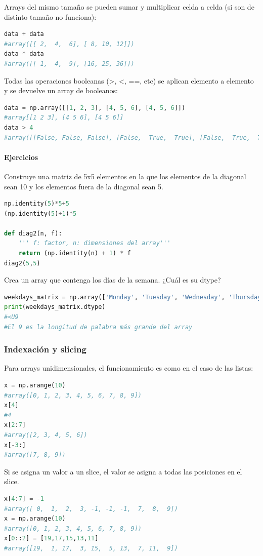 Arrays del mismo tamaño se pueden sumar y multiplicar celda a celda (si son de distinto tamaño no funciona):
\begin{lstlisting}[language=Python]
data + data
#array([[ 2,  4,  6], [ 8, 10, 12]])
data * data
#array([[ 1,  4,  9], [16, 25, 36]])
\end{lstlisting}

Todas las operaciones booleanas (>, <, ==, etc) se aplican elemento a elemento y se devuelve un array de booleanos:
\begin{lstlisting}[language=Python]
data = np.array([[1, 2, 3], [4, 5, 6], [4, 5, 6]])
#array[[1 2 3], [4 5 6], [4 5 6]]
data > 4
#array([[False, False, False], [False,  True,  True], [False,  True,  True]])
\end{lstlisting}

\paragraph{Ejercicios}
Construye una matriz de 5x5 elementos en la que los elementos de la diagonal sean 10  y los elementos fuera de la diagonal sean 5.
\begin{lstlisting}[language=Python]
np.identity(5)*5+5
(np.identity(5)+1)*5

def diag2(n, f):
	''' f: factor, n: dimensiones del array'''
	return (np.identity(n) + 1) * f
diag2(5,5)
\end{lstlisting}

Crea un array que contenga los días de la semana. ¿Cuál es su dtype?
\begin{lstlisting}[language=Python]
weekdays_matrix = np.array(['Monday', 'Tuesday', 'Wednesday', 'Thursday', 'Friday', 'Saturday', 'Sunday'])
print(weekdays_matrix.dtype)
#<U9
#El 9 es la longitud de palabra más grande del array
\end{lstlisting}

\subsubsection{Indexación y slicing}
Para arrays unidimensionales, el funcionamiento es como en el caso de las listas:
\begin{lstlisting}[language=Python]
x = np.arange(10)
#array([0, 1, 2, 3, 4, 5, 6, 7, 8, 9])
x[4] 
#4
x[2:7]
#array([2, 3, 4, 5, 6])
x[-3:]
#array([7, 8, 9])
\end{lstlisting}

Si se asigna un valor a un slice, el valor se asigna a todas las posiciones en el slice.
\begin{lstlisting}[language=Python]
x[4:7] = -1
#array([ 0,  1,  2,  3, -1, -1, -1,  7,  8,  9])
x = np.arange(10)
#array([0, 1, 2, 3, 4, 5, 6, 7, 8, 9])
x[0::2] = [19,17,15,13,11]
#array([19,  1, 17,  3, 15,  5, 13,  7, 11,  9])
\end{lstlisting}

